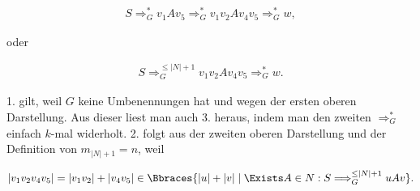 \begin{solution}
\begin{align*}
    S \Longrightarrow_G^\ast v_1 A v_5 \Longrightarrow_G^\ast v_1 v_2 A v_4 v_5 \Longrightarrow_G^\ast w,
\end{align*}

oder

\begin{align*}
    S \Longrightarrow_G^{\leq |N| + 1} v_1 v_2 A v_4 v_5 \Longrightarrow_G^\ast w.
\end{align*}

1. gilt, weil $G$ keine Umbenennungen hat und wegen der ersten oberen Darstellung.
Aus dieser liest man auch 3. heraus, indem man den zweiten $\Longrightarrow_G^\ast$ einfach $k$-mal widerholt.
2. folgt aus der zweiten oberen Darstellung und der Definition von $m_{|N| + 1} = n$, weil

\begin{align*}
    |v_1 v_2 v_4 v_5| = |v_1 v_2| + |v_4 v_5| \in \Bbraces{|u| + |v| \mid \Exists A \in N: S \Longrightarrow_G^{\leq |N| + 1} u A v}.
\end{align*}

\end{solution}

